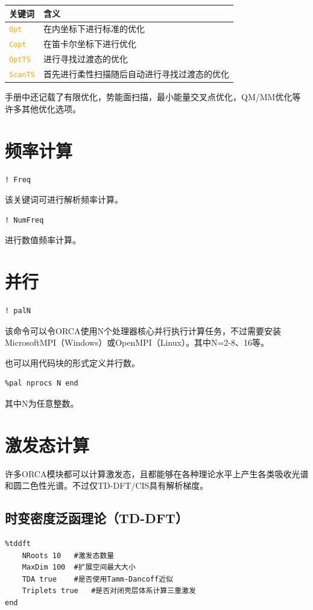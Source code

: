 \documentclass{ctexart}
\newcommand{\cmd}[1]{ \textcolor{orange}{\texttt{#1}} }
\begin{document}
	\begin{table}[H]
		\centering
		\begin{tabular}{ll}
			\toprule
			\textbf{关键词}    & \textbf{含义}                     \\
			\midrule
			\cmd{Opt}    & 在内坐标下进行标准的优化           \\
			\cmd{Copt}   & 在笛卡尔坐标下进行优化            \\
			\cmd{OptTS}  & 进行寻找过渡态的优化             \\
			\cmd{ScanTS} & 首先进行柔性扫描随后自动进行寻找过渡态的优化\\
			\bottomrule
		\end{tabular}
	\end{table}
	
	手册中还记载了有限优化，势能面扫描，最小能量交叉点优化，QM/MM优化等许多其他优化选项。
	
	\section{频率计算} 
	
	\begin{lstlisting}
! Freq
	\end{lstlisting}
	该关键词可进行解析频率计算。
	\begin{lstlisting}
! NumFreq
	\end{lstlisting}
	进行数值频率计算。
	
	\section{并行}
	\begin{lstlisting}
! palN
	\end{lstlisting}
	该命令可以令ORCA使用N个处理器核心并行执行计算任务，不过需要安装MicrosoftMPI（Windows）或OpenMPI（Linux）。其中N=2-8、16等。
	
	也可以用代码块的形式定义并行数。
	\begin{lstlisting}
%pal nprocs N end
	\end{lstlisting}
	其中N为任意整数。
	
	\section{激发态计算} 
	许多ORCA模块都可以计算激发态，且都能够在各种理论水平上产生各类吸收光谱和圆二色性光谱。不过仅TD-DFT/CIS具有解析梯度。
	
	\subsection{时变密度泛函理论（TD-DFT）} 
	\begin{lstlisting}
%tddft 
	NRoots 10	#激发态数量
	MaxDim 100	#扩展空间最大大小
	TDA true	#是否使用Tamm-Dancoff近似
	Triplets true	#是否对闭壳层体系计算三重激发
end
	\end{lstlisting}
	
\end{document}
